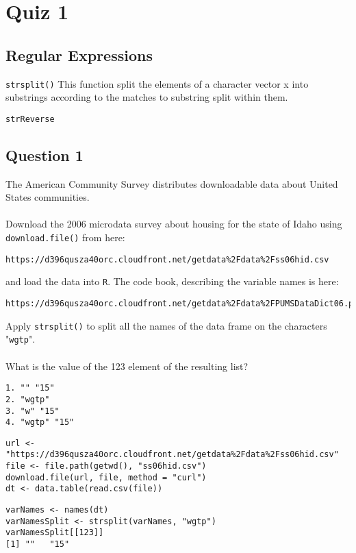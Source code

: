 \documentclass[]{article}
\begin{document}
\section*{Quiz 1}


\subsection*{Regular Expressions}
\texttt{strsplit()} This function split the elements of a character vector x into substrings according to the matches to substring split within them.

\texttt{strReverse}

\subsection*{Question 1}
The American Community Survey distributes downloadable data about United States communities. \\ \\ Download the 2006 microdata survey about housing for the state of Idaho using \texttt{download.file()} from here: 

\begin{verbatim}
https://d396qusza40orc.cloudfront.net/getdata%2Fdata%2Fss06hid.csv 
\end{verbatim}
and load the data into \texttt{R}. The code book, describing the variable names is here: 
\begin{verbatim}
https://d396qusza40orc.cloudfront.net/getdata%2Fdata%2FPUMSDataDict06.pdf 
\end{verbatim}
Apply \texttt{strsplit()} to split all the names of the data frame on the characters "\texttt{wgtp}". \\ \\ What is the value of the 123 element of the resulting list?
\begin{verbatim}
1. "" "15"
2. "wgtp"
3. "w" "15"
4. "wgtp" "15"
\end{verbatim}
\begin{framed}
\begin{verbatim}
url <- "https://d396qusza40orc.cloudfront.net/getdata%2Fdata%2Fss06hid.csv"
file <- file.path(getwd(), "ss06hid.csv")
download.file(url, file, method = "curl")
dt <- data.table(read.csv(file))
\end{verbatim}
\end{framed}
\begin{verbatim}
varNames <- names(dt)
varNamesSplit <- strsplit(varNames, "wgtp")
varNamesSplit[[123]]
[1] ""   "15"
\end{verbatim}
\newpage
\end{document}
